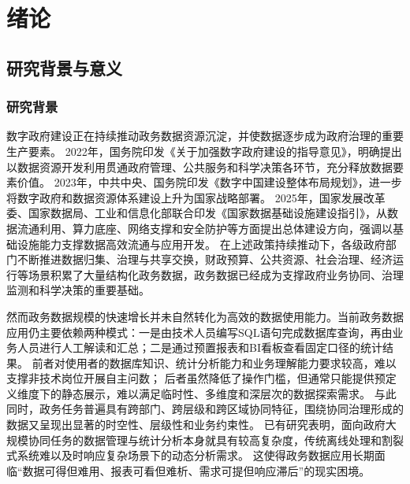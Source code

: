 \chapter{绪论}

\section{研究背景与意义}

\subsection{研究背景}

数字政府建设正在持续推动政务数据资源沉淀，并使数据逐步成为政府治理的重要生产要素。
2022年，国务院印发《关于加强数字政府建设的指导意见》，明确提出以数据资源开发利用贯通政府管理、公共服务和科学决策各环节，充分释放数据要素价值\cite{guowuyuan2022digital}。
2023年，中共中央、国务院印发《数字中国建设整体布局规划》，进一步将数字政府和数据资源体系建设上升为国家战略部署\cite{zhonggong2023shuzichina}。
2025年，国家发展改革委、国家数据局、工业和信息化部联合印发《国家数据基础设施建设指引》，从数据流通利用、算力底座、网络支撑和安全防护等方面提出总体建设方向，强调以基础设施能力支撑数据高效流通与应用开发\cite{ndrc2025infrastructure}。
在上述政策持续推动下，各级政府部门不断推进数据归集、治理与共享交换，财政预算、公共资源、社会治理、经济运行等场景积累了大量结构化政务数据，政务数据已经成为支撑政府业务协同、治理监测和科学决策的重要基础\cite{孟天广2021,张聪丛2024}。

然而政务数据规模的快速增长并未自然转化为高效的数据使用能力。当前政务数据应用仍主要依赖两种模式：一是由技术人员编写SQL语句完成数据库查询，再由业务人员进行人工解读和汇总；二是通过预置报表和BI看板查看固定口径的统计结果。
前者对使用者的数据库知识、统计分析能力和业务理解能力要求较高，难以支撑非技术岗位开展自主问数；
后者虽然降低了操作门槛，但通常只能提供预定义维度下的静态展示，难以满足临时性、多维度和深层次的数据探索需求\cite{孟天广2021,张聪丛2024}。
与此同时，政务任务普遍具有跨部门、跨层级和跨区域协同特征，围绕协同治理形成的数据又呈现出显著的时空性、层级性和业务约束性。
已有研究表明，面向政府大规模协同任务的数据管理与统计分析本身就具有较高复杂度，传统离线处理和割裂式系统难以及时响应复杂场景下的动态分析需求\cite{王璐璐2023}。
这使得政务数据应用长期面临“数据可得但难用、报表可看但难析、需求可提但响应滞后”的现实困境。


